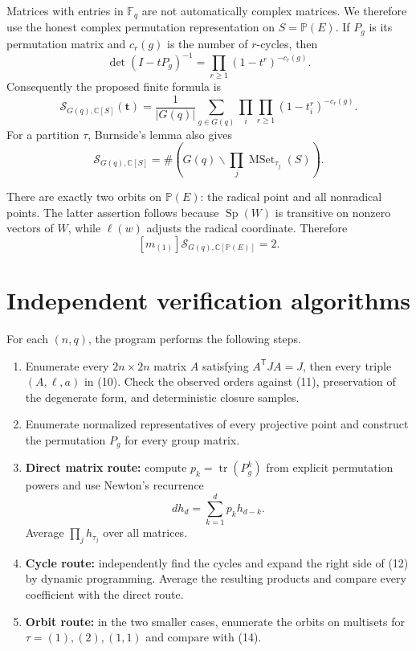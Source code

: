\documentclass[11pt]{article}
\newcommand{\Sfun}{\mathcal S}
\newcommand{\Sp}{\operatorname{Sp}}
\begin{document}
Matrices with entries in $\mathbb F_q$ are not automatically complex matrices.
We therefore use the honest complex permutation representation on
$S=\mathbb P(E)$. If $P_g$ is its permutation matrix and $c_r(g)$ is the
number of $r$-cycles, then
\begin{equation}
 \det(I-tP_g)^{-1}=\prod_{r\ge1}(1-t^r)^{-c_r(g)}.
\end{equation}
Consequently the proposed finite formula is
\begin{equation}
 \boxed{\Sfun_{G(q),\mathbb C[S]}(\mathbf t)
 =\frac1{|G(q)|}\sum_{g\in G(q)}
 \prod_i\prod_{r\ge1}(1-t_i^r)^{-c_r(g)}.}
\end{equation}
For a partition $\tau$, Burnside's lemma also gives
\begin{equation}
 [m_\tau]\Sfun_{G(q),\mathbb C[S]}
 =\#\left(G(q)\backslash\prod_j\operatorname{MSet}_{\tau_j}(S)\right).
\end{equation}

There are exactly two orbits on $\mathbb P(E)$: the radical point and all
nonradical points. The latter assertion follows because $\Sp(W)$ is transitive
on nonzero vectors of $W$, while $\ell(w)$ adjusts the radical coordinate.
Therefore
\begin{equation}
 \boxed{[m_{(1)}]\Sfun_{G(q),\mathbb C[\mathbb P(E)]}=2.}
\end{equation}

\section{Independent verification algorithms}

For each $(n,q)$, the program performs the following steps.
\begin{enumerate}[leftmargin=*,itemsep=3pt]
\item Enumerate every $2n\times2n$ matrix $A$ satisfying
$A^{\mathsf T}JA=J$, then every triple $(A,\ell,a)$ in (10). Check the observed
orders against (11), preservation of the degenerate form, and deterministic
closure samples.
\item Enumerate normalized representatives of every projective point and
construct the permutation $P_g$ for every group matrix.
\item \textbf{Direct matrix route:} compute $p_k=\operatorname{tr}(P_g^k)$
from explicit permutation powers and use Newton's recurrence
\[
 d h_d=\sum_{k=1}^d p_kh_{d-k}.
\]
Average $\prod_jh_{\tau_j}$ over all matrices.
\item \textbf{Cycle route:} independently find the cycles and expand the
right side of (12) by dynamic programming. Average the resulting products and
compare every coefficient with the direct route.
\item \textbf{Orbit route:} in the two smaller cases, enumerate the orbits on
multisets for $\tau=(1),(2),(1,1)$ and compare with (14).
\end{enumerate}
\end{document}
